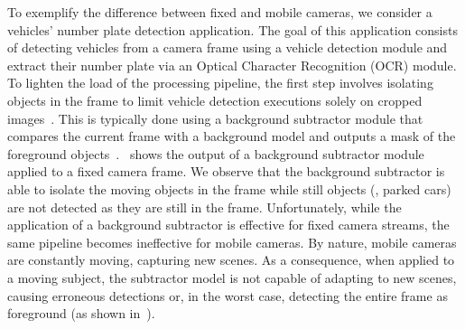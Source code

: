 To exemplify the difference between fixed and mobile cameras, we consider a vehicles' number plate detection application. The goal of this application consists of detecting vehicles from a camera frame using a vehicle detection module and extract their number plate via an Optical Character Recognition (OCR) module. To lighten the load of the processing pipeline, the first step involves isolating objects in the frame to limit vehicle detection executions solely on cropped images~\cite{zeng2020distream}. This is typically done using a background subtractor module that compares the current frame with a background model and outputs a mask of the foreground objects~\cite{zeng2020distream}.~ shows the output of a background subtractor module applied to a fixed camera frame. We observe that the background subtractor is able to isolate the moving objects in the frame while still objects (\eg, parked cars) are not detected as they are still in the frame. Unfortunately, while the application of a background subtractor is effective for fixed camera streams, the same pipeline becomes ineffective for mobile cameras. By nature, mobile cameras are constantly moving, capturing new scenes. As a consequence, when applied to a moving subject, the subtractor model is not capable of adapting to new scenes, causing erroneous detections or, in the worst case, detecting the entire frame as foreground (as shown in~).


